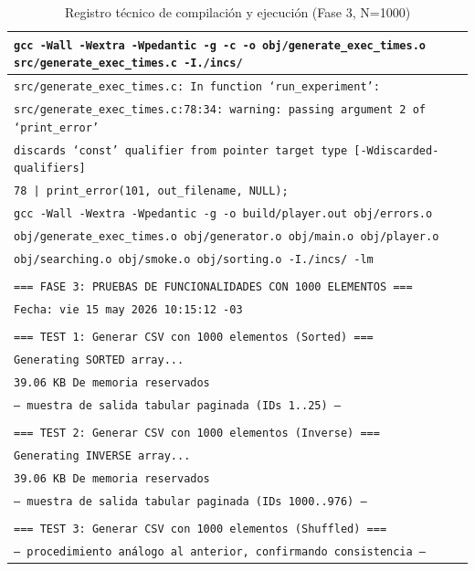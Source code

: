 \begin{table}[H]
\centering
\caption{Registro técnico de compilación y ejecución (Fase 3, N=1000)}
\label{tab:log_excerpt}
\begin{tabular}{|p{\dimexpr\linewidth-2\tabcolsep-2\arrayrulewidth\relax}|}
\hline
\texttt{\footnotesize gcc -Wall -Wextra -Wpedantic -g -c -o obj/generate\_exec\_times.o src/generate\_exec\_times.c -I./incs/} \\
\hline
\texttt{\footnotesize src/generate\_exec\_times.c: In function `run\_experiment':} \\
\hline
\texttt{\footnotesize src/generate\_exec\_times.c:78:34: warning: passing argument 2 of `print\_error'} \\
\hline
\texttt{\footnotesize discards `const' qualifier from pointer target type [-Wdiscarded-qualifiers]} \\
\hline
\texttt{\footnotesize \phantom{xx}78 | print\_error(101, out\_filename, NULL);} \\
\hline
\texttt{\footnotesize gcc -Wall -Wextra -Wpedantic -g -o build/player.out obj/errors.o} \\
\hline
\texttt{\footnotesize obj/generate\_exec\_times.o obj/generator.o obj/main.o obj/player.o} \\
\hline
\texttt{\footnotesize obj/searching.o obj/smoke.o obj/sorting.o -I./incs/ -lm} \\
\hline
\texttt{\footnotesize } \\
\hline
\texttt{\footnotesize === FASE 3: PRUEBAS DE FUNCIONALIDADES CON 1000 ELEMENTOS ===} \\
\hline
\texttt{\footnotesize Fecha: vie 15 may 2026 10:15:12 -03} \\
\hline
\texttt{\footnotesize } \\
\hline
\texttt{\footnotesize === TEST 1: Generar CSV con 1000 elementos (Sorted) ===} \\
\hline
\texttt{\footnotesize Generating SORTED array...} \\
\hline
\texttt{\footnotesize 39.06 KB De memoria reservados} \\
\hline
\texttt{\footnotesize -- muestra de salida tabular paginada (IDs 1..25) --} \\
\hline
\texttt{\footnotesize } \\
\hline
\texttt{\footnotesize === TEST 2: Generar CSV con 1000 elementos (Inverse) ===} \\
\hline
\texttt{\footnotesize Generating INVERSE array...} \\
\hline
\texttt{\footnotesize 39.06 KB De memoria reservados} \\
\hline
\texttt{\footnotesize -- muestra de salida tabular paginada (IDs 1000..976) --} \\
\hline
\texttt{\footnotesize } \\
\hline
\texttt{\footnotesize === TEST 3: Generar CSV con 1000 elementos (Shuffled) ===} \\
\hline
\texttt{\footnotesize -- procedimiento análogo al anterior, confirmando consistencia --} \\
\hline
\end{tabular}
\end{table}

